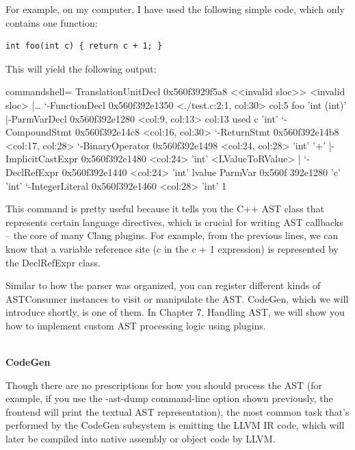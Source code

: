 
For example, on my computer, I have used the following simple code, which only contains one function:

\begin{lstlisting}[style=styleCXX]
int foo(int c) { return c + 1; }
\end{lstlisting}

This will yield the following output:

\begin{tcblisting}{commandshell={}}
TranslationUnitDecl 0x560f3929f5a8 <<invalid sloc>> <invalid
sloc>
|…
`-FunctionDecl 0x560f392e1350 <./test.c:2:1, col:30> col:5 foo
'int (int)'
  |-ParmVarDecl 0x560f392e1280 <col:9, col:13> col:13 used c
'int'
  `-CompoundStmt 0x560f392e14c8 <col:16, col:30>
    `-ReturnStmt 0x560f392e14b8 <col:17, col:28>
      `-BinaryOperator 0x560f392e1498 <col:24, col:28> 'int' '+'
        |-ImplicitCastExpr 0x560f392e1480 <col:24> 'int' <LValueToRValue>
        |   `-DeclRefExpr 0x560f392e1440 <col:24> 'int' lvalue ParmVar 0x560f
              392e1280 'c' 'int'
        `-IntegerLiteral 0x560f392e1460 <col:28> 'int' 1
\end{tcblisting}

This command is pretty useful because it tells you the C++ AST class that represents certain language directives, which is crucial for writing AST callbacks – the core of many Clang plugins. For example, from the previous lines, we can know that a variable reference site (c in the c + 1 expression) is represented by the DeclRefExpr class.

Similar to how the parser was organized, you can register different kinds of ASTConsumer instances to visit or manipulate the AST. CodeGen, which we will introduce shortly, is one of them. In Chapter 7, Handling AST, we will show you how to implement custom AST processing logic using plugins.

\hspace*{\fill} \\ %
\noindent
\textbf{CodeGen}

Though there are no prescriptions for how you should process the AST (for example, if you use the -ast-dump command-line option shown previously, the frontend will print the textual AST representation), the most common task that's performed by the CodeGen subsystem is emitting the LLVM IR code, which will later be compiled into native assembly or object code by LLVM.

